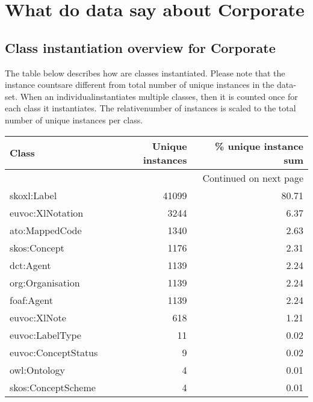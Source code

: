 \documentclass[10pt,a4paper,titlepage,final]{article}
\begin{document}
\section{What do data say about Corporate}
\subsection{Class instantiation overview for Corporate}
The table below describes how are classes instantiated. Please note that the instance countsare different from total number of unique instances in the data{-}set. When an individualinstantiates multiple classes, then it is counted once for each class it instantiates. The relativenumber of instances is scaled to the total number of unique instances per class.
\begin{longtable}{lrr}
\toprule
               Class &  Unique instances &  \% unique instance sum \\
\midrule
\endhead
\midrule
\multicolumn{3}{r}{{Continued on next page}} \\
\midrule
\endfoot

\bottomrule
\endlastfoot
         skoxl:Label &             41099 &                  80.71 \\
    euvoc:XlNotation &              3244 &                   6.37 \\
      ato:MappedCode &              1340 &                   2.63 \\
        skos:Concept &              1176 &                   2.31 \\
           dct:Agent &              1139 &                   2.24 \\
    org:Organisation &              1139 &                   2.24 \\
          foaf:Agent &              1139 &                   2.24 \\
        euvoc:XlNote &               618 &                   1.21 \\
     euvoc:LabelType &                11 &                   0.02 \\
 euvoc:ConceptStatus &                 9 &                   0.02 \\
        owl:Ontology &                 4 &                   0.01 \\
  skos:ConceptScheme &                 4 &                   0.01 \\
\end{longtable}
\end{document}
